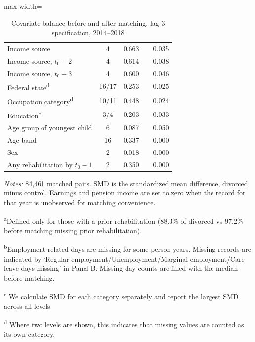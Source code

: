 \documentclass[a4paper,12pt]{article}
\theoremstyle{plain}
\theoremstyle{definition}
\theoremstyle{TheoremNum}
\theoremstyle{CorollaryNum}
\theoremstyle{PropositionNum}
\theoremstyle{TheoremNum}
\begin{document}
\begin{table}[H]
\begin{adjustbox}{max width=\textwidth}
\begin{tabular}{lrrrrrr}
Income source & \multicolumn{2}{c}{4} & 0.663 & \multicolumn{2}{c}{} & 0.035 \\
Income source, $t_0-2$ & \multicolumn{2}{c}{4} & 0.614 & \multicolumn{2}{c}{} & 0.038 \\
Income source, $t_0-3$ & \multicolumn{2}{c}{4} & 0.600 & \multicolumn{2}{c}{} & 0.046 \\
Federal state\textsuperscript{d} & \multicolumn{2}{c}{16/17} & 0.253 & \multicolumn{2}{c}{} & 0.025 \\
Occupation category\textsuperscript{d} & \multicolumn{2}{c}{10/11} & 0.448 & \multicolumn{2}{c}{} & 0.024 \\
Education\textsuperscript{d} & \multicolumn{2}{c}{3/4} & 0.203 & \multicolumn{2}{c}{} & 0.033 \\
Age group of youngest child & \multicolumn{2}{c}{6} & 0.087 & \multicolumn{2}{c}{} & 0.050 \\
Age band & \multicolumn{2}{c}{16} & 0.337 & \multicolumn{2}{c}{} & 0.000 \\
Sex & \multicolumn{2}{c}{2} & 0.018 & \multicolumn{2}{c}{} & 0.000 \\
Any rehabilitation by $t_0-1$ & \multicolumn{2}{c}{2} & 0.350 & \multicolumn{2}{c}{} & 0.000 \\
\bottomrule
\end{tabular}
\end{adjustbox}
\caption{Covariate balance before and after matching, lag-3 specification, 2014--2018}
\label{tab:balance}
\begin{minipage}{\textwidth}
\scriptsize
\textit{Notes:} 84,461 matched pairs. SMD is the standardized mean difference, divorced minus control. Earnings and pension income are set to zero when the record for that year is unobserved for matching convenience.

\textsuperscript{a}Defined only for those with a prior rehabilitation (88.3\% of divorced vs 97.2\% before matching missing prior rehabilitation).

\textsuperscript{b}Employment related days are missing for some person-years. Missing records are indicated by `Regular employment/Unemployment/Marginal employment/Care leave days missing' in Panel B. Missing day counts are filled with the median before matching.

\textsuperscript{c} We calculate SMD for each category separately and report the largest SMD across all levels

\textsuperscript{d} Where two levels are shown, this indicates that missing values are counted as its own category.
\end{minipage}
\end{table}
\end{document}
